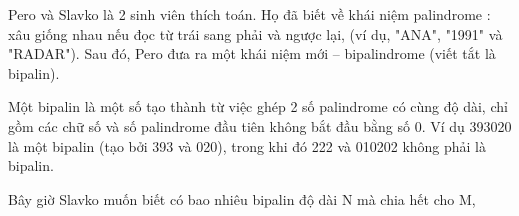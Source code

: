 Pero và Slavko là 2 sinh viên thích toán. Họ đã biết về khái niệm palindrome : xâu giống nhau nếu đọc từ trái sang phải và ngược lại, (ví dụ,  "ANA",  "1991"  và "RADAR"). Sau đó, Pero đưa ra một khái niệm mới –  bipalindrome (viết tắt là bipalin).  

   Một bipalin  là một số tạo thành từ việc ghép 2 số palindrome có cùng độ dài, chỉ gồm các chữ số và số palindrome đầu tiên không bắt đầu bằng số 0. Ví dụ  393020 là một bipalin (tạo bởi 393 và 020), trong khi đó 222 và 010202 không phải là bipalin.  

   Bây giờ Slavko muốn biết có bao nhiêu bipalin độ dài N mà chia hết cho M,  



\